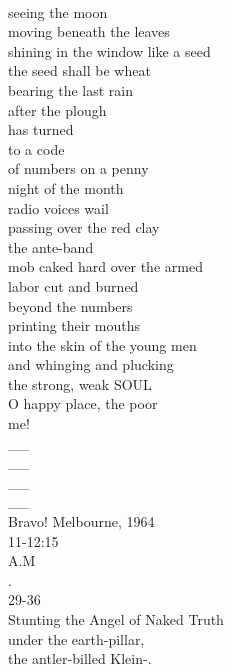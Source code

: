 \documentclass[smalldemyvopaper,11pt,twoside,onecolumn,openright,extrafontsizes]{memoir}
\begin{document}
\\seeing the moon
\\moving beneath the leaves
\\shining in the window like a seed
\\the seed shall be wheat
\\bearing the last rain
\\after the plough
\\has turned
\\to a code
\\of numbers on a penny
\\night of the month
\\radio voices wail
\\passing over the red clay
\\the ante-band
\\mob caked hard over the armed
\\labor cut and burned
\\beyond the numbers
\\printing their mouths
\\into the skin of the young men
\\and whinging and plucking
\\the strong, weak SOUL
\\O happy place, the poor
\\me!
\\__
\\__
\\__
\\__
\\Bravo! Melbourne, 1964
\\11-12:15
\\A.M
\\.
\\29-36
\\Stunting the Angel of Naked Truth
\\under the earth-pillar,
\\the antler-billed Klein-.
\end{document}
